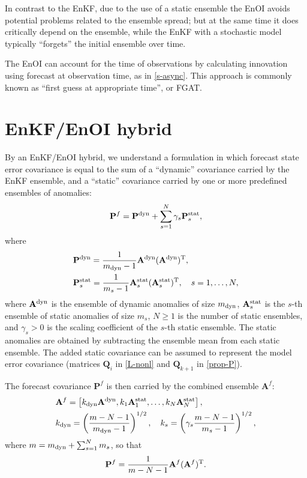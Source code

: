 \documentclass[11pt]{report}
\newcommand{\mb} {\mathbf}
\newcommand{\T}{^{\tiny \mathrm T}}
\newcommand*\suptxt[1]{^{\textnormal{#1}}}
\newcommand*\subtxt[1]{_{\textnormal{#1}}}
\begin{document}
In contrast to the EnKF, due to the use of a static ensemble the EnOI avoids potential problems related to the ensemble spread; but at the same time it does critically depend on the ensemble, while the EnKF with a stochastic model typically ``forgets'' the initial ensemble over time.

The EnOI can account for the time of observations by calculating innovation using forecast at observation time, as in \eqref{s-async}.
This approach is commonly known as ``first guess at appropriate time'', or FGAT.

\section{EnKF/EnOI hybrid}
\label{sec:hybrid-theory}

By an EnKF/EnOI hybrid, we understand a formulation in which forecast state error covariance is equal to the sum of a ``dynamic'' covariance carried by the EnKF ensemble, and a ``static'' covariance carried by one or more predefined ensembles of anomalies:
\begin{align}
  \label{hybrid_covariance}
  \mb P^f = \mb P\suptxt{dyn} + \sum_{s = 1}^N \gamma_s \mb P\suptxt{stat}_s,
\end{align}
where
\begin{align*}
  & \mb P\suptxt{dyn} = \frac{1}{m\subtxt{dyn} - 1}\mb A\suptxt{dyn} (\mb A\suptxt{dyn})\T,\\
  & \mb P\suptxt{stat}_s = \frac{1}{m_s - 1}\mb A\suptxt{stat}_s (\mb A\suptxt{stat}_s)\T, \quad s = 1, \dots, N,
\end{align*}
where $\mb A\suptxt{dyn}$ is the ensemble of dynamic anomalies of size $m\subtxt{dyn}$, $\mb A\suptxt{stat}_s$ is the $s$-th ensemble of static anomalies of size $m_s$, $N \ge 1$ is the number of static ensembles, and $\gamma_s > 0$ is the scaling coefficient of the $s$-th static ensemble.
The static anomalies are obtained by subtracting the ensemble mean from each static ensemble.
The added static covariance can be assumed to represent the model error covariance (matrices $\mb Q_i$ in \eqref{L-nonl} and $\mb Q_{k+1}$ in \eqref{prop-P}).

The forecast covariance $\mb P^f$ is then carried by the combined ensemble $\mb A^f$:
\begin{align}
  \label{hybrid_combined}
  & \mb A^f = \left[ k\subtxt{dyn} \mb A\suptxt{dyn}, k_1 \mb A\suptxt{stat}_1, \dots, k_N \mb A\suptxt{stat}_N \right],\\
  \nonumber
  & k\subtxt{dyn} = \left(\frac{m - N - 1}{m\subtxt{dyn} - 1}\right)^{1/2}, \quad k_s = \left(\gamma_s \frac{m - N - 1}{m_s - 1}\right)^{1/2},
\end{align}
where $m = m\subtxt{dyn} + \sum_{s=1}^N m_s$, so that
\begin{align}
  \label{cov_combined}
  \mb P^f = \frac{1}{m - N - 1} \mb A^f (\mb A^f)\T.
\end{align}
\end{document}

